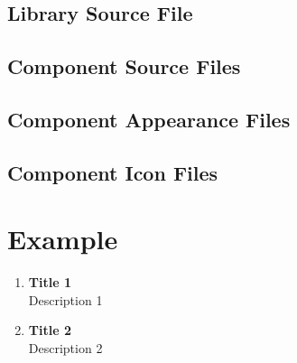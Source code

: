 \documentclass[a4paper,pdftex]{article}
\begin{document}
\subsection*{Library Source File}

\subsection*{Component Source Files}

\subsection*{Component Appearance Files}

\subsection*{Component Icon Files}

\section{Example}

\begin{enumerate}
\item \textbf{Title 1}\\
Description 1

\item \textbf{Title 2}\\
Description 2

\end{enumerate}
 	
\end{document}
